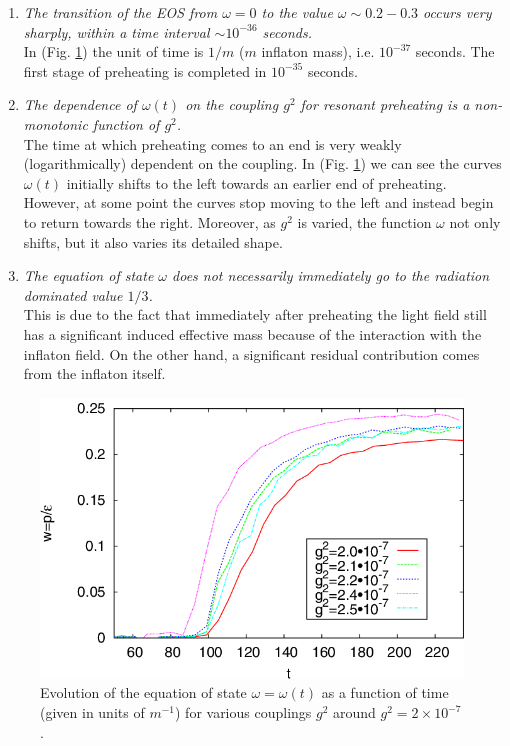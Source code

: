 \documentclass[11pt,a4paper,twoside]{book}
\begin{document}
\begin{enumerate}
	\item \textit{The transition of the EOS from $\omega=0$ to the value $\omega \sim 0.2-0.3$ occurs very sharply, within a time interval $\sim 10^{-36}$ seconds.}\\
	In (Fig. \ref{fig:equationofstatefig1}) the unit of time is $ 1/m $ ($ m $ inflaton mass), i.e. $ 10^{-37} $ seconds. The first stage of preheating is completed in $ 10^{-35} $ seconds.
	\item \textit{The dependence of $\omega(t)$ on the coupling $ g^{2} $ for resonant preheating is a non-monotonic function of $ g^{2} $.}\\
	The time at which preheating comes to an end is very weakly (logarithmically) dependent on the coupling. In (Fig. \ref{fig:equationofstatefig1}) we can see the curves $\omega(t)$ initially shifts to the left towards an earlier end of preheating. However, at some point the curves stop moving to the left and instead begin to return towards the right. Moreover, as $ g^{2} $ is varied, the function $\omega$ not only shifts, but it also varies its detailed shape.
	\item \textit{The equation of state $\omega$ does not necessarily immediately go to the radiation dominated value $ 1/3 $.}\\
	This is due to the fact that immediately after preheating the light field still has a significant induced effective mass because of the interaction with the inflaton field. On the other hand, a significant residual contribution comes from the inflaton itself. 
\end{enumerate}
\begin{figure}
	\centering
	\includegraphics[width=0.6\linewidth, height=0.25\textheight]{Images/Chap6/EquationOfState_fig1}
	\caption{Evolution of the equation of state $\omega =\omega (t)$ as a function of time (given in units of $ m^{-1} $) for various couplings $ g^{2} $ around $ g^{2}=2 \times 10^{-7} $ \cite{Chap7:Peloso_Thermalitation}.}
	\label{fig:equationofstatefig1}
\end{figure}
\end{document}

